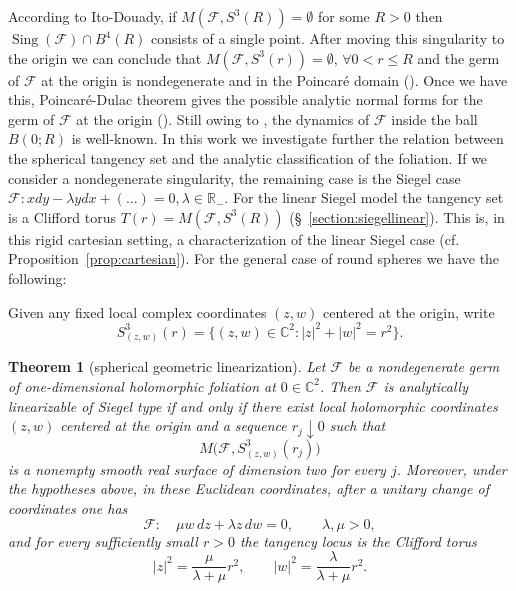 \documentclass[11pt,reqno]{article}
\newtheorem{theorem}{Theorem}
\theoremstyle{remark}
\newcommand{\C}{\mathbb C}
\newcommand{\F}{\mathcal F}
\newcommand{\Sing}{\operatorname{Sing}}
\begin{document}
According to Ito-Douady, if $M(\F,S^3(R))=\emptyset$ for some $R>0$ then $\Sing(\F)\cap B^4(R)$ consists of a single point. After moving this singularity to the origin we can conclude that 
$M(\F,S^3(r))=\emptyset,\, \forall 0<r\leq R$ and the germ of $\F$ at the origin is nondegenerate and  in the Poincaré domain (\cite{Ito,Ito1996}).  Once we have this, Poincaré-Dulac theorem gives the possible analytic normal forms for the germ of $\F$ at the origin (\cite{Ilyashenko-Yakovenko}). 
Still owing to \cite{Ito}, the dynamics of $\F$ inside the 
ball $B(0;R)$ is well-known. In this work we investigate further the relation between the spherical tangency set and the analytic classification of the foliation.  If we consider a nondegenerate singularity, the remaining case is the Siegel case $\F: xdy - \lambda ydx + (...)=0, \lambda \in \mathbb R_-$. For the linear Siegel model the tangency set is a Clifford torus $T(r)=M(\F, S^3(R))$ (\S~\ref{section:siegellinear}). This is, in this rigid cartesian setting, a characterization of the linear  Siegel case (cf. Proposition~\ref{prop:cartesian}). 
For the general case of round spheres we have the following:

Given any fixed local complex coordinates $(z,w)$ centered at the origin, write
\[
 S^3_{(z,w)}(r)=\{(z,w)\in\C^2:|z|^2+|w|^2=r^2\}.
\]

\begin{theorem}[spherical geometric linearization]\label{thm:spherical-characterization}
Let $\F$ be a nondegenerate germ of one-dimensional holomorphic foliation at $0\in\C^2$. Then $\F$ is analytically linearizable of Siegel type if and only if there exist local holomorphic coordinates $(z,w)$ centered at the origin and a sequence $r_j\downarrow0$ such that
\[
 M\bigl(\F,S^3_{(z,w)}(r_j)\bigr)
\]
is a nonempty smooth real surface of dimension two for every $j$. Moreover, under the hypotheses above, in these Euclidean coordinates, after a unitary change of coordinates one has
\[
 \F:\quad \mu w\,dz+\lambda z\,dw=0,
 \qquad \lambda,\mu>0,
\]
and for every sufficiently small $r>0$ the tangency locus is the Clifford torus
\[
 |z|^2=\frac{\mu}{\lambda+\mu}r^2,
 \qquad
 |w|^2=\frac{\lambda}{\lambda+\mu}r^2.
\]
\end{theorem}
\end{document}
